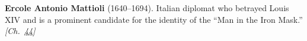 \textbf{Ercole Antonio Mattioli} (1640–1694). Italian diplomat who betrayed Louis XIV and is a prominent candidate for the identity of the ``Man in the Iron Mask.'' \emph{[Ch.~\hyperref[ch:ironmask]{44}]}

